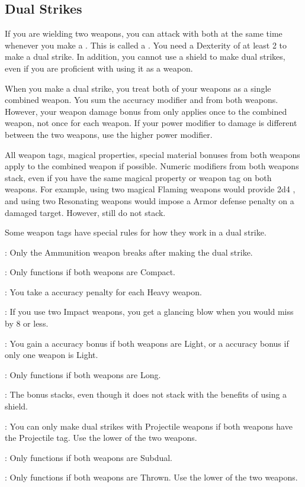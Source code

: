   \subsection{Dual Strikes}\label{Dual Strikes}
    If you are wielding two weapons, you can attack with both at the same time whenever you make a .
    This is called a .
    You need a Dexterity of at least 2 to make a dual strike.
    In addition, you cannot use a shield to make dual strikes, even if you are proficient with using it as a weapon.

    When you make a dual strike, you treat both of your weapons as a single combined weapon.
    You sum the accuracy modifier and  from both weapons.
    However, your weapon damage bonus from  only applies once to the combined weapon, not once for each weapon.
    If your power modifier to damage is different between the two weapons, use the higher power modifier.

    All weapon tags, magical properties, special material bonuses from both weapons apply to the combined weapon if possible.
    Numeric modifiers from both weapons stack, even if you have the same magical property or weapon tag on both weapons.
    For example, using two magical Flaming weapons would provide 2d4 , and using two Resonating weapons would impose a  Armor defense penalty on a damaged target.
    However,  still do not stack.

    Some weapon tags have special rules for how they work in a dual strike.
    \begin{raggeditemize}
      \item {}: Only the Ammunition weapon breaks after making the dual strike.
      \item {}: Only functions if both weapons are Compact.
      \item {}: You take a  accuracy penalty for each Heavy weapon.
      \item {}: If you use two Impact weapons, you get a glancing blow when you would miss by 8 or less.
      \item {}: You gain a  accuracy bonus if both weapons are Light, or a  accuracy bonus if only one weapon is Light.
      \item {}: Only functions if both weapons are Long.
      \item {}: The bonus stacks, even though it does not stack with the benefits of using a shield.
      \item {}: You can only make dual strikes with Projectile weapons if both weapons have the Projectile tag. Use the lower  of the two weapons.
      \item {}: Only functions if both weapons are Subdual.
      \item {}: Only functions if both weapons are Thrown. Use the lower  of the two weapons.
    \end{raggeditemize}

